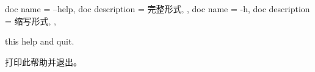 \begin{docKeys}[
    doc no index,   %
    doc parameter = {~},
    ]
    {
    {
        doc name        = --help,
        doc description = 完整形式,
    },
    {
        doc name        = -h,
        doc description = 缩写形式,
    },
    }
    
    this help and quit.


    打印此帮助并退出。
    
\end{docKeys}
    
    